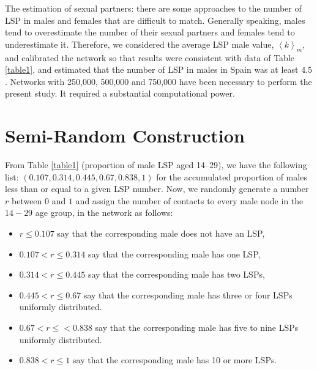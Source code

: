 The estimation of sexual partners: there are some approaches to the number of LSP in males and females \cite{chandra2013sexual,mosher2005sexual} that are difficult to match. Generally speaking, males tend to overestimate the number of their sexual partners and females tend to underestimate it. Therefore, we considered the average LSP male value, $\left\langle k \right\rangle_m$, and calibrated the network so that results were consistent with data of Table \ref{table1}, and estimated that the number of LSP in males in Spain was at least $4.5$. Networks with 250,000, 500,000 and 750,000 have been necessary to perform the present study. It required a substantial computational power.

\section{Semi-Random Construction}
\label{subsec22}

From Table \ref{table1} (proportion of male LSP aged 14--29), we have the following list:
$( 0.107, 0.314, 0.445, 0.67, 0.838, 1)$ for the accumulated proportion of males less than or equal to a given LSP number.
Now, we randomly generate a number $r$ between $0$ and $1$ and assign the number of contacts to every male node in the $14-29$
age group, in the network as follows:

\begin{itemize}[leftmargin=*,labelsep=5mm]
\item $r \le 0.107$ say that the corresponding male does not have an LSP,
\item $0.107 < r \le 0.314$ say that the corresponding male has one LSP,
\item $0.314 < r \le 0.445$ say that the corresponding male has two LSPs,
\item $0.445 < r \le 0.67$  say that the corresponding male has three or four LSPs uniformly distributed.
\item $0.67 < r \le < 0.838$ say that the corresponding male has five to nine LSPs uniformly distributed.
\item $0.838 < r \le 1$ say that the corresponding male has 10 or more LSPs.
\end{itemize}

